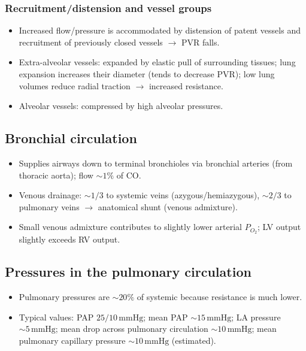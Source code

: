 \documentclass[11pt,a4paper]{article}
\begin{document}
\subsubsection{Recruitment/distension and vessel groups}
\begin{itemize}
  \item Increased flow/pressure is accommodated by distension of patent vessels and recruitment of previously closed vessels \(\rightarrow\) PVR falls.
  \item Extra-alveolar vessels: expanded by elastic pull of surrounding tissues; lung expansion increases their diameter (tends to decrease PVR); low lung volumes reduce radial traction \(\rightarrow\) increased resistance.
  \item Alveolar vessels: compressed by high alveolar pressures.
\end{itemize}

\subsection{Bronchial circulation}
\begin{itemize}
  \item Supplies airways down to terminal bronchioles via bronchial arteries (from thoracic aorta); flow \(\sim 1\%\) of CO.
  \item Venous drainage: \(\sim 1/3\) to systemic veins (azygous/hemiazygous), \(\sim 2/3\) to pulmonary veins \(\rightarrow\) anatomical shunt (venous admixture).
  \item Small venous admixture contributes to slightly lower arterial \(P_{O_2}\); LV output slightly exceeds RV output.
\end{itemize}

\subsection{Pressures in the pulmonary circulation}
\begin{itemize}
  \item Pulmonary pressures are \(\sim 20\%\) of systemic because resistance is much lower.
  \item Typical values: PAP \(25/10\,\mathrm{mmHg}\); mean PAP \(\sim 15\,\mathrm{mmHg}\); LA pressure \(\sim 5\,\mathrm{mmHg}\); mean drop across pulmonary circulation \(\sim 10\,\mathrm{mmHg}\); mean pulmonary capillary pressure \(\sim 10\,\mathrm{mmHg}\) (estimated).
\end{itemize}
\end{document}
